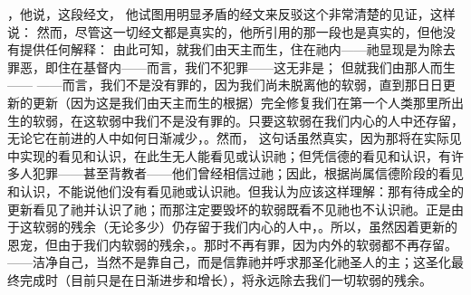 ，他说，这段经文， 他试图用明显矛盾的经文来反驳这个非常清楚的见证，这样说： 然而，尽管这一切经文都是真实的，他所引用的那一段也是真实的，但他没有提供任何解释： 由此可知，就我们由天主而生，住在祂内——祂显现是为除去罪恶，即住在基督内——而言，我们不犯罪——这无非是； 但就我们由那人而生—— ——而言，我们不是没有罪的，因为我们尚未脱离他的软弱，直到那日日更新的更新（因为这是我们由天主而生的根据）完全修复我们在第一个人类那里所出生的软弱，在这软弱中我们不是没有罪的。只要这软弱在我们内心的人中还存留，无论它在前进的人中如何日渐减少，。然而， 这句话虽然真实，因为那将在实际见中实现的看见和认识，在此生无人能看见或认识祂；但凭信德的看见和认识，有许多人犯罪——甚至背教者——他们曾经相信过祂；因此，根据尚属信德阶段的看见和认识，不能说他们没有看见祂或认识祂。但我认为应该这样理解：那有待成全的更新看见了祂并认识了祂；而那注定要毁坏的软弱既看不见祂也不认识祂。正是由于这软弱的残余（无论多少）仍存留于我们内心的人中，。所以，虽然因着更新的恩宠，但由于我们内软弱的残余，。那时不再有罪，因为内外的软弱都不再存留。——洁净自己，当然不是靠自己，而是信靠祂并呼求那圣化祂圣人的主；这圣化最终完成时（目前只是在日渐进步和增长），将永远除去我们一切软弱的残余。\par


